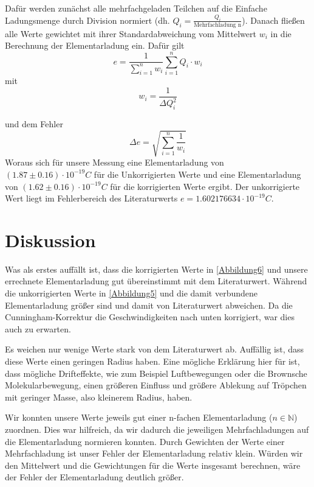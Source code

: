 \documentclass{scrartcl}
\begin{document}
            Dafür werden zunächst
            alle mehrfachgeladen Teilchen auf die Einfache Ladungsmenge durch Division normiert (dh. $Q_i = \frac{Q_i}{\text{Mehrfachladung n}}$).
            Danach fließen alle Werte gewichtet mit ihrer Standardabweichung vom Mittelwert $w_i$ in die Berechnung der
            Elementarladung ein. Dafür gilt
            \begin{equation}
                e = \frac{1}{\sum_{i=1}^n w_i} \sum_{i=1}^n Q_i \cdot w_i 
            \end{equation}
            mit 
            \begin{equation}
                w_i = \frac{1}{\Delta Q_i^2}
            \end{equation}

            und dem Fehler
            \begin{equation}
                \Delta e = \sqrt{\sum_{i=1}^n\frac{1}{w_i}}
            \end{equation}
            Woraus sich für unsere Messung eine Elementarladung von $(1.87 \pm 0.16)\cdot 10^{-19} C$ für die Unkorrigierten Werte und eine
            Elementarladung von $(1.62\pm 0.16)\cdot 10^{-19}C$ für die korrigierten Werte ergibt.
            Der unkorrigierte Wert liegt im Fehlerbereich des Literaturwerts $e=1.602176634\cdot 10^{-19}C$.
            \section{Diskussion}
                Was als erstes auffällt ist, dass die korrigierten Werte in \ref{Abbildung6} und unsere errechnete
                Elementarladung gut übereinstimmt mit dem Literaturwert. Während die unkorrigierten Werte in \ref{Abbildung5}
                und die damit verbundene Elementarladung größer sind und damit von Literaturwert abweichen. Da die Cunningham-Korrektur
                die Geschwindigkeiten nach unten korrigiert, war dies auch zu erwarten. 

                Es weichen nur wenige Werte stark von dem Literaturwert ab. Auffällig ist, dass diese Werte einen geringen Radius haben.
                Eine mögliche Erklärung hier für ist, dass mögliche Drifteffekte, wie zum Beispiel Luftbewegungen oder die Brownsche
                Molekularbewegung, einen größeren Einfluss und größere Ablekung auf Tröpchen mit geringer Masse, also kleinerem Radius,
                haben. 

                Wir konnten unsere Werte jeweils gut einer n-fachen Elementarladung ($n \in \mathbb{N} $)
                zuordnen. Dies war hilfreich, da wir dadurch die jeweiligen Mehrfachladungen auf die Elementarladung
                normieren konnten. Durch Gewichten der Werte einer Mehrfachladung ist unser Fehler der Elementarladung
                relativ klein. Würden wir den Mittelwert und die Gewichtungen für die Werte insgesamt berechnen,
                wäre der Fehler der Elementarladung deutlich größer.
\end{document}

